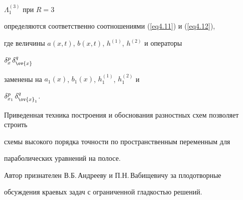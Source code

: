$\Lambda_1^{(3)}$ при $R=3$


определяются соответственно соотношениями (\ref{eq4.11}) и (\ref{eq4.12}),


где величины $a(x,t)$, $b(x,t)$, $h^{(1)}$, $h^{(2)}$ и операторы


$\delta^p_x\,\delta^q_{\ov{x}}\,$


заменены на $a_1(x)$, $b_1(x)$, $h_1^{(1)}$, $h_1^{(2)}$ и


$\delta^p_{x_1}\,\delta^q_{\ov{x}_1}$.





Приведенная техника построения и обоснования разностных схем позволяет строить


схемы высокого порядка точности по пространственным переменным для


параболических уравнений на полосе.





Автор признателен В.Б.\,Андрееву и П.Н.\,Вабищевичу за плодотворные


обсуждения краевых задач с ограниченной гладкостью решений.








